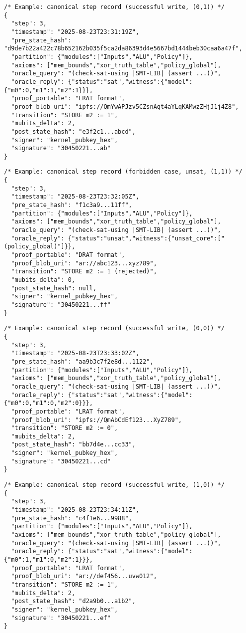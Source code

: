 \documentclass[11pt]{article}
\begin{document}
\begin{verbatim}
/* Example: canonical step record (successful write, (0,1)) */
{
  "step": 3,
  "timestamp": "2025-08-23T23:31:19Z",
  "pre_state_hash": "d9de7b22a422c78b652162b035f5ca2da86393d4e5667bd1444beb30caa6a47f",
  "partition": {"modules":["Inputs","ALU","Policy"]},
  "axioms": ["mem_bounds","xor_truth_table","policy_global"],
  "oracle_query": "(check-sat-using |SMT-LIB| (assert ...))",
  "oracle_reply": {"status":"sat","witness":{"model":{"m0":0,"m1":1,"m2":1}}},
  "proof_portable": "LRAT format",
  "proof_blob_uri": "ipfs://QmYwAPJzv5CZsnAqt4aYLqKAMwzZHjJ1j4Z8",
  "transition": "STORE m2 := 1",
  "mubits_delta": 2,
  "post_state_hash": "e3f2c1...abcd",
  "signer": "kernel_pubkey_hex",
  "signature": "30450221...ab"
}
\end{verbatim}

\begin{verbatim}
/* Example: canonical step record (forbidden case, unsat, (1,1)) */
{
  "step": 3,
  "timestamp": "2025-08-23T23:32:05Z",
  "pre_state_hash": "f1c3a9...11ff",
  "partition": {"modules":["Inputs","ALU","Policy"]},
  "axioms": ["mem_bounds","xor_truth_table","policy_global"],
  "oracle_query": "(check-sat-using |SMT-LIB| (assert ...))",
  "oracle_reply": {"status":"unsat","witness":{"unsat_core":["(policy_global)"]}},
  "proof_portable": "DRAT format",
  "proof_blob_uri": "ar://abc123...xyz789",
  "transition": "STORE m2 := 1 (rejected)",
  "mubits_delta": 0,
  "post_state_hash": null,
  "signer": "kernel_pubkey_hex",
  "signature": "30450221...ff"
}
\end{verbatim}

\begin{verbatim}
/* Example: canonical step record (successful write, (0,0)) */
{
  "step": 3,
  "timestamp": "2025-08-23T23:33:02Z",
  "pre_state_hash": "aa9b3c7f2e8d...1122",
  "partition": {"modules":["Inputs","ALU","Policy"]},
  "axioms": ["mem_bounds","xor_truth_table","policy_global"],
  "oracle_query": "(check-sat-using |SMT-LIB| (assert ...))",
  "oracle_reply": {"status":"sat","witness":{"model":{"m0":0,"m1":0,"m2":0}}},
  "proof_portable": "LRAT format",
  "proof_blob_uri": "ipfs://QmAbCdEf123...XyZ789",
  "transition": "STORE m2 := 0",
  "mubits_delta": 2,
  "post_state_hash": "bb7d4e...cc33",
  "signer": "kernel_pubkey_hex",
  "signature": "30450221...cd"
}
\end{verbatim}

\begin{verbatim}
/* Example: canonical step record (successful write, (1,0)) */
{
  "step": 3,
  "timestamp": "2025-08-23T23:34:11Z",
  "pre_state_hash": "c4f1e6...9988",
  "partition": {"modules":["Inputs","ALU","Policy"]},
  "axioms": ["mem_bounds","xor_truth_table","policy_global"],
  "oracle_query": "(check-sat-using |SMT-LIB| (assert ...))",
  "oracle_reply": {"status":"sat","witness":{"model":{"m0":1,"m1":0,"m2":1}}},
  "proof_portable": "LRAT format",
  "proof_blob_uri": "ar://def456...uvw012",
  "transition": "STORE m2 := 1",
  "mubits_delta": 2,
  "post_state_hash": "d2a9b0...a1b2",
  "signer": "kernel_pubkey_hex",
  "signature": "30450221...ef"
}
\end{verbatim}
\end{document}
